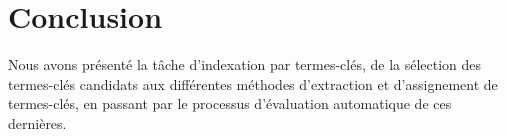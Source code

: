 


  \section{Conclusion}
  \label{sec:main-state_of_the_art-automatic_evaluation_of_keyphrase_annotation-conclusion}
    Nous avons présenté la tâche d'indexation par termes-clés, de la sélection
    des termes-clés candidats aux différentes méthodes d'extraction et
    d'assignement de termes-clés, en passant par le processus d'évaluation
    automatique de ces dernières.

